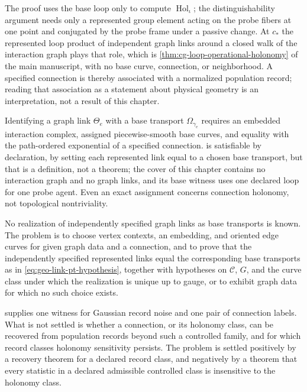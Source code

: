 The proof uses the base loop only to compute \(\operatorname{Hol}_\iota\); the
distinguishability argument needs only a represented group element acting on the
probe fibers at one point and conjugated by the probe frame under a passive
change. At \(c_*\) the represented loop product of independent graph links
around a closed walk of the interaction graph plays that role, which is
\cref{thm:cg-loop-operational-holonomy} of the main manuscript, with no base
curve, connection, or neighborhood. A specified connection is thereby associated
with a normalized population record; reading that association as a statement
about physical geometry is an interpretation, not a result of this chapter.

Identifying a graph link \(\Theta_e\) with a base transport \(\Omega_{\gamma_e}\)
requires an embedded interaction complex, assigned piecewise-smooth base curves,
and equality with the path-ordered exponential of a specified connection.
 is satisfiable by declaration, by setting each
represented link equal to a chosen base transport, but that is a definition, not
a theorem; the cover of this chapter contains no interaction graph and no graph
links, and its base witness uses one declared loop for one probe agent. Even an
exact assignment concerns connection holonomy, not topological nontriviality.

No realization of independently specified graph links as base transports is
known. The problem is to choose vertex contexts, an embedding, and oriented edge
curves for given graph data and a connection, and to prove that the independently
specified represented links equal the corresponding base transports as in
\eqref{eq:geo-link-pt-hypothesis}, together with hypotheses on \(\mathcal C\),
\(G\), and the curve class under which the realization is unique up to gauge,
or to exhibit graph data for which no such choice exists.

 supplies one witness for Gaussian record
noise and one pair of connection labels. What is not settled is whether a
connection, or its holonomy class, can be recovered from population records
beyond such a controlled family, and for which record classes holonomy
sensitivity persists. The problem is settled positively by a recovery theorem
for a declared record class, and negatively by a theorem that every statistic in
a declared admissible controlled class is insensitive to the holonomy class.

